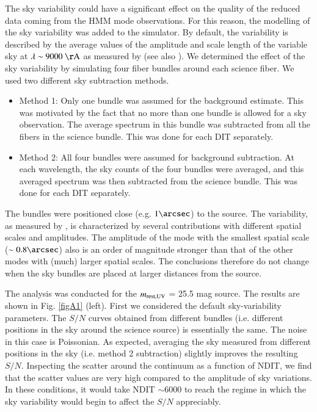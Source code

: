 \documentclass{aa}
\begin{document}
{{{{{{{{{{{{{{The sky variability could have a significant effect on the quality of the reduced data coming from the HMM mode observations. For this reason, the modelling of the sky variability was added to the simulator. By default, the variability is described by the average values of the amplitude and scale length of the variable sky at $\lambda \sim 9000~\mathrm{\AA}$ as measured by \citet{Puech2012} (see also \citealt{Rodrigues2010,Yang2012}). We determined the effect of the sky variability by simulating four fiber bundles around each science fiber. We used two different sky subtraction methods.
\begin{itemize}
\item Method 1: Only one bundle was assumed for the background estimate. This was motivated by the fact that no more than one bundle is allowed for a sky observation. The average spectrum in this bundle was subtracted from all the fibers in the science bundle. This was done for each DIT separately.
\item Method 2: All four bundles were assumed for background subtraction. At each wavelength, the sky counts of the four bundles were averaged, and this averaged spectrum was then subtracted from the science bundle. This was done for each DIT separately.
\end{itemize}
\noindent The bundles were positioned close (e.g. $1\arcsec$) to the source. The variability, as measured by \citet{Puech2012}, is characterized by several contributions with different spatial scales and amplitudes. The amplitude of the mode with the smallest spatial scale ($\sim 0.8\arcsec$) also is an order of magnitude stronger than that of the other modes with (much) larger spatial scales. The conclusions therefore do not change when the sky bundles are placed at larger distances from the source.

The analysis was conducted for the $m_{\rm rest,UV}$ = 25.5 mag source. The results are shown in Fig. \ref{figA1} (left). First we considered the default sky-variability parameters. The $S/N$ curves obtained from different bundles (i.e. different positions in the sky around the science source) is essentially the same. The noise in this case is Poissonian. As expected, averaging the sky measured from different positions in the sky (i.e. method 2 subtraction) slightly improves the resulting $S/N$. Inspecting the scatter around the continuum as a function of NDIT, we find that the scatter values are very high compared to the amplitude of sky variations. In these conditions, it would take NDIT $\sim 6000$ to reach the regime in which the sky variability would begin to affect the $S/N$ appreciably.

}}}}}}}}}}}}}}
\end{document}
